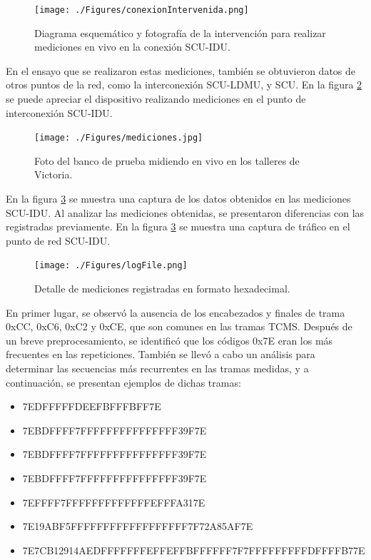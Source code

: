 \begin{figure}[H]
	\centering
      \texttt{[image: ./Figures/conexionIntervenida.png]}
	\caption{Diagrama esquemático y fotografía de la intervención para realizar mediciones en vivo en la conexión SCU-IDU.}
	\label{fig:conexionIntervenida}
\end{figure}

En el ensayo que se realizaron estas mediciones, también se obtuvieron datos de otros puntos de la red, como la interconexión SCU-LDMU, y SCU. En la figura \ref{fig:mediciones} se puede apreciar el dispositivo realizando mediciones en el punto de interconexión SCU-IDU. \\

 \begin{figure}[H]
	\centering
	\texttt{[image: ./Figures/mediciones.jpg]}
	\caption{Foto del banco de prueba midiendo en vivo en los talleres de Victoria.}
	\label{fig:mediciones}
\end{figure}

En la figura \ref{fig:logFile} se muestra una captura de los datos obtenidos en las mediciones SCU-IDU. Al analizar las mediciones obtenidas, se presentaron diferencias con las registradas previamente. En la figura \ref{fig:logFile} se muestra una captura de tráfico en el punto de red SCU-IDU.\\

\begin{figure}[H]
	\centering
	\texttt{[image: ./Figures/logFile.png]}
	\caption{Detalle de mediciones registradas en formato hexadecimal.}
	\label{fig:logFile}
\end{figure}

En primer lugar, se observó la ausencia de los encabezados y finales de trama 0xCC, 0xC6, 0xC2 y 0xCE, que son comunes en las tramas TCMS. Después de un breve preprocesamiento, se identificó que los códigos 0x7E eran los más frecuentes en las repeticiones. También se llevó a cabo un análisis para determinar las secuencias más recurrentes en las tramas medidas, y a continuación, se presentan ejemplos de dichas tramas:

\begin{itemize}
\item 7EDFFFFFDEEFBFFFBFF7E
\item 7EBDFFFF7FFFFFFFFFFFFFFF39F7E
\item 7EBDFFFF7FFFFFFFFFFFFFFF39F7E
\item 7EBDFFFF7FFFFFFFFFFFFFFF39F7E
\item 7EFFFF7FFFFFFFFFFFFFEFFFA317E
\item 7E19ABF5FFFFFFFFFFFFFFFFFF7F72A85AF7E
\item 7E7CB12914AEDFFFFFFFEFFEFFBFFFFFF7F7FFFFFFFFFDFFFFB77E
\end{itemize}

